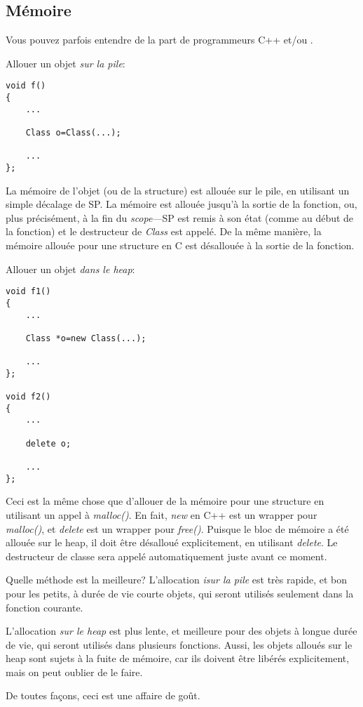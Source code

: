 \subsection{Mémoire}

Vous pouvez parfois entendre de la part de programmeurs C++ 
et/ou .

Allouer un objet \emph{sur la pile}:

\begin{lstlisting}[style=customc]
void f()
{
	...

	Class o=Class(...);

	...
};
\end{lstlisting}

La mémoire de l'objet (ou de la structure) est allouée sur le pile, en utilisant
un simple décalage de \ac{SP}.
La mémoire est allouée jusqu'à la sortie de la fonction, ou, plus précisément, à
la fin du \emph{scope}---\ac{SP} est remis à son état (comme au début de la fonction)
et le destructeur de \emph{Class} est appelé.
De la même manière, la mémoire allouée pour une structure en C est désallouée à la
sortie de la fonction.

Allouer un objet \emph{dans le \gls{heap}}:

\begin{lstlisting}[style=customc]
void f1()
{
	...

	Class *o=new Class(...);

	...
};

void f2()
{
	...

	delete o;

	...
};
\end{lstlisting}

Ceci est la même chose que d'allouer de la mémoire pour une structure en utilisant
un appel à \emph{malloc()}.
En fait, \emph{new} en C++ est un wrapper pour \emph{malloc()}, et \emph{delete} est un
wrapper pour \emph{free()}.
Puisque le bloc de mémoire a été allouée sur le \gls{heap}, il doit être désalloué
explicitement, en utilisant \emph{delete}.
Le destructeur de classe sera appelé automatiquement juste avant ce moment.

Quelle méthode est la meilleure?
L'allocation \emph{isur la pile} est très rapide, et bon pour les petits, à durée de
vie courte objets, qui seront utilisés seulement dans la fonction courante.

L'allocation \emph{sur le heap} est plus lente, et meilleure pour des objets à longue
durée de vie, qui seront utilisés dans plusieurs fonctions.
Aussi, les objets alloués sur le \gls{heap} sont sujets à la fuite de mémoire, car
ils doivent être libérés explicitement, mais on peut oublier de le faire.

De toutes façons, ceci est une affaire de goût.
